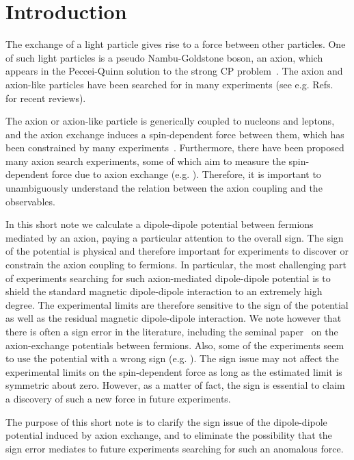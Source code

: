 \documentclass[12pt, a4paper]{article}
\begin{document}
\section{Introduction}
The exchange of a light particle gives rise to a force between other particles. 
One of such light particles is  a pseudo Nambu-Goldstone boson,  an axion, which
 appears in the Peccei-Quinn solution to the strong CP problem~\cite{Peccei:1977hh,Peccei:1977ur,Weinberg:1977ma,Wilczek:1977pj}.
The axion and axion-like particles have been searched for in many experiments
 (see e.g. Refs.~\cite{Kim:2008hd,Wantz:2009it,Ringwald:2012hr,Kawasaki:2013ae,Marsh:2015xka} 
 for recent reviews). 
 
 The axion or axion-like particle is generically coupled to nucleons and leptons, and the axion
exchange induces a spin-dependent force between them, which has been
constrained by many experiments~\cite{Olive:2016xmw}.
Furthermore,  there have been proposed many axion search experiments, 
 some of which aim to measure the spin-dependent force due to axion exchange 
 (e.g. \cite{Arvanitaki:2014dfa}). Therefore, it is important to unambiguously understand the relation between 
 the axion coupling and the observables.

In this short note we calculate a dipole-dipole potential  between fermions mediated by an axion, 
paying a particular attention to the overall sign.  The sign of the potential is physical and therefore
important for experiments to discover or constrain the axion coupling to fermions. In particular, 
the most challenging part of experiments searching for such axion-mediated dipole-dipole potential is 
to shield the standard magnetic dipole-dipole interaction to an extremely high degree. 
The experimental limits are therefore sensitive to the sign of the potential as well as the residual magnetic 
dipole-dipole interaction. 
We note however that there is often a sign error in the literature,
including the seminal paper~\cite{Moody:1984ba} on the axion-exchange potentials between fermions. 
Also, some of the experiments seem to use the potential with a wrong sign 
(e.g. \cite{Vasilakis:2008yn,Kotler:2015ura,Terrano:2015sna}).
The sign issue may not affect the experimental limits on the spin-dependent force
as long as the estimated limit is symmetric about zero. 
However, as a matter of fact, the sign is essential to claim a discovery of such a new force in future experiments. 


The purpose of this short note is to clarify the sign issue of the dipole-dipole potential induced 
by axion exchange, 
and to eliminate the possibility that the sign error mediates to future experiments searching for such an 
anomalous force. 
\end{document}
